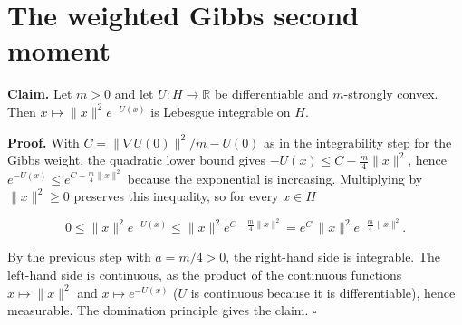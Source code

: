\documentclass[11pt,a4paper]{article}
\begin{document}
\section{\texorpdfstring{The weighted Gibbs second moment}{The weighted Gibbs second moment}}


\textbf{Claim.} Let \(m>0\) and let \(U:H\to\mathbb R\) be differentiable and \(m\)-strongly convex. Then \(x\mapsto\|x\|^2e^{-U(x)}\) is Lebesgue integrable on \(H\).




\textbf{Proof.} With \(C=\|\nabla U(0)\|^2/m-U(0)\) as in the integrability step for the Gibbs weight, the quadratic lower bound gives \(-U(x)\le C-\frac m4\|x\|^2\), hence \(e^{-U(x)}\le e^{C-\frac m4\|x\|^2}\) because the exponential is increasing. Multiplying by \(\|x\|^2\ge0\) preserves this inequality, so for every \(x\in H\)


\[0\le\|x\|^2e^{-U(x)}\le\|x\|^2e^{C-\frac m4\|x\|^2}=e^C\,\|x\|^2e^{-\frac m4\|x\|^2}.\]


By the previous step with \(a=m/4>0\), the right-hand side is integrable. The left-hand side is continuous, as the product of the continuous functions \(x\mapsto\|x\|^2\) and \(x\mapsto e^{-U(x)}\) (\(U\) is continuous because it is differentiable), hence measurable. The domination principle gives the claim. \(\square\)
\end{document}
